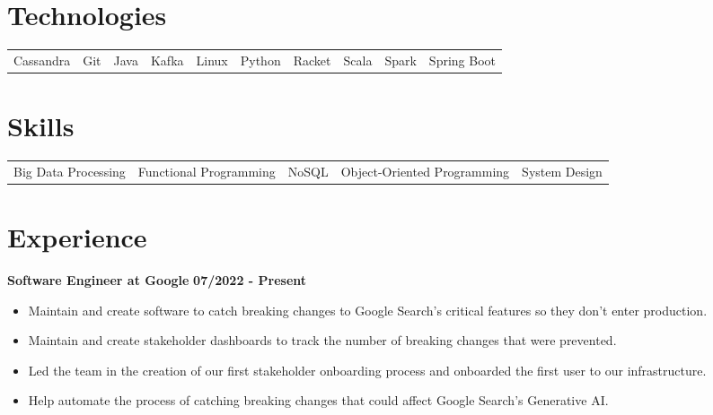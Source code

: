 \documentclass{res}
\begin{document}
\address{www.anthonyhicksiii.com}
\address{ahicks3rd@gmail.com}

\setlength\itemsep{0em}

\begin{resume}
\section{\large{Technologies}}
\begin{tabular}{	l	l	l 	l	l	l	l	l	l	l 	}
	Cassandra  & Git  & Java & Kafka & Linux & Python & Racket & Scala & Spark & Spring Boot
\end{tabular}

\section{\large{Skills}}
\begin{tabular}{	l 	l 	l 	l	l 	}
	Big Data Processing & Functional Programming & NoSQL & Object-Oriented Programming & System Design
\end{tabular}

\section{\large{Experience}}
	\textbf{Software Engineer at Google}
	\hfill{\bf 07/2022 - Present}
	\begin{itemize}
		\item Maintain and create software to catch breaking changes to Google Search's critical features so they don't enter production.
		\item Maintain and create stakeholder dashboards to track the number of breaking changes that were prevented.
		\item Led the team in the creation of our first stakeholder onboarding process and onboarded the first user to our infrastructure.
		\item Help automate the process of catching breaking changes that could affect Google Search's Generative AI.
	\end{itemize}
	

\end{resume}
\end{document}
